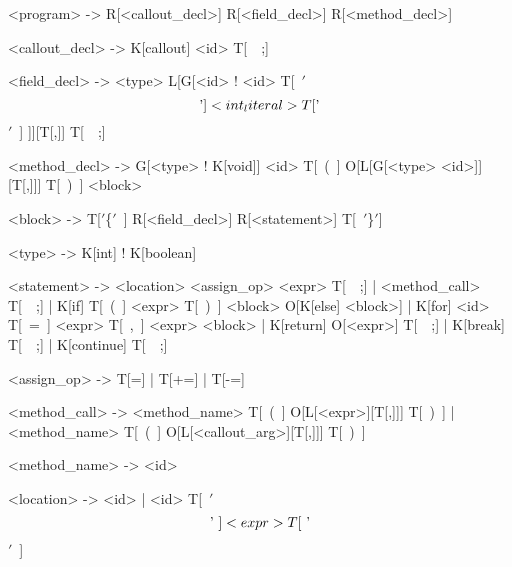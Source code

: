 \begin{bnfgrammar}
<program> -> R[<callout_decl>] R[<field_decl>] R[<method_decl>] 

<callout_decl> -> K[callout] <id> T[~~;]

<field_decl> -> <type> L[G[<id> ! <id> T[~$'$\[$'$] <int_literal> T[$'$\]$'$~] ]][T[,]] T[~~;]

<method_decl> -> G[<type> ! K[void]] <id> T[~(~] O[L[G[<type> <id>]][T[,]]] T[~)~] <block>

<block> -> T[$'$\{$'$~] R[<field_decl>]  R[<statement>] T[~$'$\}$'$]


<type> -> K[int] ! K[boolean]

<statement> -> <location> <assign_op> <expr> T[~~;]
             | <method_call> T[~~;]
             | K[if] T[~(~] <expr> T[~)~] <block> O[K[else] <block>]
             | K[for] <id> T[~=~] <expr> T[~,~] <expr> <block>
             | K[return] O[<expr>] T[~~;]
             | K[break] T[~~;]
             | K[continue] T[~~;]

<assign_op> -> T[=]
             | T[+=]
	     | T[-=]	

<method_call> -> <method_name> T[~(~] O[L[<expr>][T[,]]] T[~)~]
        |        <method_name> T[~(~] O[L[<callout_arg>][T[,]]] T[~)~]

<method_name> -> <id>

<location> -> <id>
            | <id> T[~$'$\[$'$~] <expr> T[~$'$\]$'$~]

\end{bnfgrammar}

